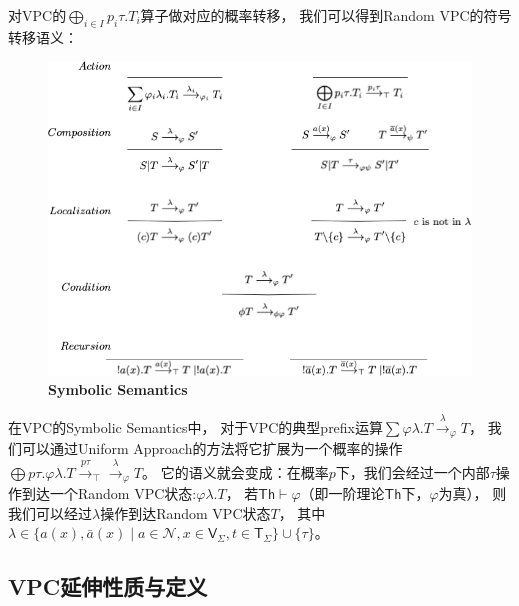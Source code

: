 对VPC的$\bigoplus_{i\in I}p_i \tau.T_i$算子做对应的概率转移，
我们可以得到Random VPC的符号转移语义：

\begin{figure}[!htbp]
	\small
	\centering
	\includegraphics[width=13cm]{../figure/symbolic_sematic.png}
    \caption{\textbf{Symbolic Semantics}}
    \label{fig_sematic}
\end{figure}

在VPC的Symbolic Semantics中，
对于VPC的典型prefix运算$\sum \varphi \lambda. T\stackrel{\lambda}{\rightarrow}_{\varphi} T$，
我们可以通过Uniform Approach的方法将它扩展为一个概率的操作
$\bigoplus p\tau.\varphi \lambda. T\stackrel{p\tau}{\rightarrow}_{\top}\stackrel{\lambda}{\rightarrow}_{\varphi} T$。
它的语义就会变成：在概率$p$下，我们会经过一个内部$\tau$操作到达一个Random VPC状态:$\varphi\lambda.T$，
若$\mathsf{Th}\vdash \varphi$（即一阶理论$\mathsf{Th}$下，$\varphi$为真），
则我们可以经过$\lambda$操作到达Random VPC状态$T$， 其中$\lambda \in \{a(x),\bar{a}(x)\mid a\in \mathcal{N}, x\in \mathsf{V}_\Sigma, t\in \mathsf{T}_\Sigma\}\cup \{\tau\}$。

\subsection{VPC延伸性质与定义}

